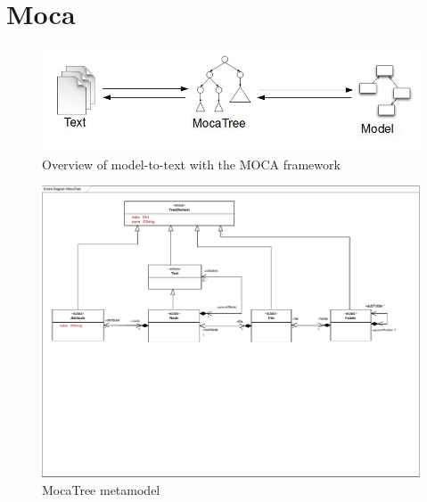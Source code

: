 \chapter{Moca}

\begin{figure}[htp]
\begin{center}
 \includegraphics[width=\textwidth]{pics/moca/overview}
  \caption{Overview of model-to-text with the MOCA framework}
  \label{moca-overview}
\end{center}
\end{figure} 
 
\begin{figure}[htp]
\begin{center}
 \includegraphics[width=\textwidth]{pics/moca/0Install/0-MocaTree}
  \caption{MocaTree metamodel}
  \label{moca-mocatree}
\end{center}
\end{figure}  
 
